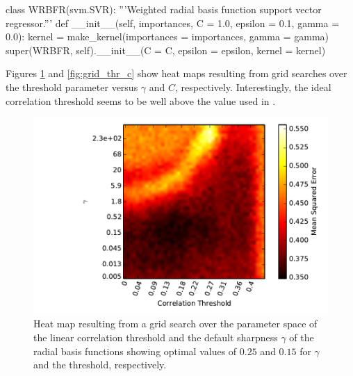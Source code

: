 \begin{snippet}
	class WRBFR(svm.SVR):
		'''Weighted radial basis function support vector regressor.'''
		def __init__(self, importances, C = 1.0, epsilon = 0.1,
				      gamma = 0.0):
		kernel = make_kernel(importances = importances, gamma = gamma)
		super(WRBFR, self).__init__(C = C, epsilon = epsilon, kernel = kernel)
\end{snippet}
Figures \ref{fig:grid_thr_g} and \ref{fig:grid_thr_c} show heat maps resulting from grid searches over the threshold parameter versus $\gamma$ and $C$, respectively. Interestingly, the ideal correlation threshold seems to be well above the value used in \cite{demontjoye2013}.
\begin{figure}
	\includegraphics[width=\figwidth]{pics/ml/15_07_17_grid_search_g_thr_extra.pdf}
	\caption{Heat map resulting from a grid search over the parameter space of the linear correlation threshold and the default sharpness $\gamma$ of the radial basis functions showing optimal values of $0.25$ and $0.15$ for $\gamma$ and the threshold, respectively.}
	\label{fig:grid_thr_g}
\end{figure}


